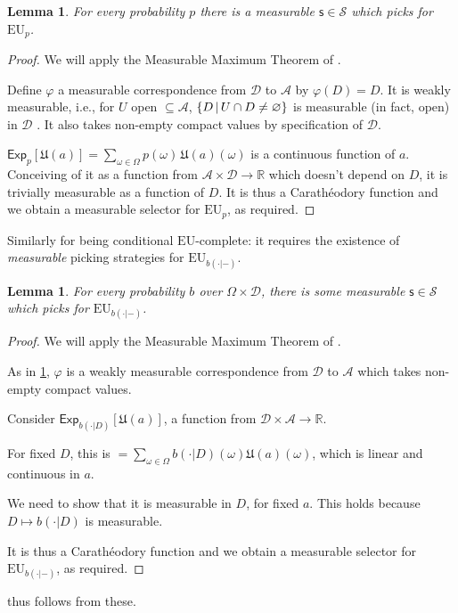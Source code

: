 \documentclass[a4paper,final]{article}
\newtheorem{lemma}[theorem]{Lemma}
\newcommand\A{\mathcal{A}}
\newcommand\Exp{\mathsf{Exp}}
\newcommand\EU{\mathrm{EU}}
\newcommand\U{\mathfrak{U}} %
\newcommand{\Decs}{\mathcal{D}}
\renewcommand\S{\mathcal{S}}
\newcommand\s{\mathsf{s}}
\renewcommand{\Re}{\mathbb{R}}
\renewcommand{\color}[1]{}
\newenvironment{colored}[1]{\leavevmode\color{#1}}{}
\newcommand\SetDelimiter[1][]{
	\nonscript\,#1\vert \allowbreak \nonscript\,\mathopen{}}
\providecommand\given{\SetDelimiter}
\renewcommand{\emptyset}{\varnothing}
\newenvironment{CCM rewritten}
{\begingroup\color{blue}} %
{\endgroup}              %
\begin{document}
\begin{colored}{violet}
\begin{lemma}\label{thm:EU-complete-measurable}
	For every probability $p$ there is a measurable $\s\in\S$ which picks for $\EU_p$. 
\end{lemma}
\begin{proof}
	We will apply the Measurable Maximum Theorem of \citet[Theorem 18.19]{aliprantis2006infinite}.
	
	Define $\varphi$ a measurable correspondence from $\Decs$ to $\A$ by $\varphi(D)=D$. It is weakly measurable, i.e., for $U$ open $\subseteq\A$, $\{D\given U\cap D\neq\emptyset\}$ is measurable (in fact, open) in $\Decs$ \citep[3.91]{aliprantis2006infinite}. It also takes non-empty compact values by specification of $\Decs$. 
	
	$\Exp_p[\U(a)]=\sum_{\omega\in\Omega}p(\omega)\,\U(a)(\omega)$ is a continuous function of $a$. Conceiving of it as a function from $\A\times\Decs\to\Re$ which doesn't depend on $D$, it is trivially measurable as a function of $D$. 
	It is thus a Carathéodory function and we obtain a measurable selector for $\EU_p$, as required. 
\end{proof}

Similarly for being conditional $\EU$-complete: it requires the existence of \emph{measurable} picking strategies for $\EU_{b(\cdot|-)}$. 

\begin{lemma}\label{thm:EU-complete-measurable[dep]}
	For every probability $b$ over $\Omega\times\Decs$, there is some measurable $\s\in\S$ which picks for $\EU_{b(\cdot|-)}$. 
\end{lemma}

\begin{proof}
	We will apply the Measurable Maximum Theorem of \citet[Theorem 18.19]{aliprantis2006infinite}. 

As in \cref{thm:EU-complete-measurable}, $\varphi$ is a weakly measurable correspondence from $\Decs$ to $\A$ which takes non-empty compact values. 
	
	Consider $\Exp_{b(\cdot|D)}[\U(a)]$, a function from $\Decs\times\A\to\Re$. 
	
	For fixed $D$, this is $=\sum_{\omega\in\Omega}b(\cdot|D)(\omega)\U(a)(\omega)$, which is linear and continuous in $a$. 
	
	We need to show that it is measurable in $D$, for fixed $a$. This holds because $D\mapsto b(\cdot|D)$ is measurable. 
	
	It is thus a Carathéodory function and we obtain a measurable selector for $\EU_{b(\cdot|-)}$, as required. 
\end{proof}

 thus follows from these. 

\end{colored}
\end{document}

